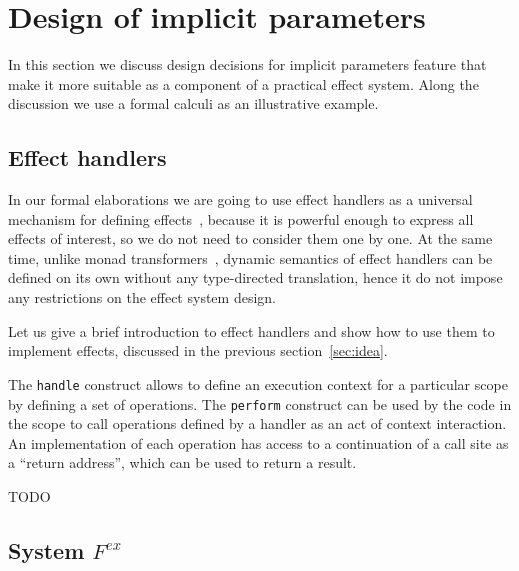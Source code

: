 \documentclass[acmsmall]{acmart}
\begin{document}
\section{Design of implicit parameters} \label{sec:implicits}

In this section we discuss design decisions for implicit parameters feature that make it more suitable as a component of a practical effect system.
Along the discussion we use a formal calculi as an illustrative example.

\subsection{Effect handlers} \label{subsec:handlers}

In our formal elaborations we are going to use effect handlers as a universal mechanism for defining effects~\cite{plotkin2003algebraic, plotkin2013handling}, because it is powerful enough to express all effects of interest, so we do not need to consider them one by one.
At the same time, unlike monad transformers~\cite{liang1995monad, schrijvers2019monad}, dynamic semantics of effect handlers can be defined on its own without any type-directed translation, hence it do not impose any restrictions on the effect system design.

Let us give a brief introduction to effect handlers and show how to use them to implement effects, discussed in the previous section~\ref{sec:idea}.

The \texttt{handle} construct allows to define an execution context for a particular scope by defining a set of operations.
The \texttt{perform} construct can be used by the code in the scope to call operations defined by a handler as an act of context interaction.
An implementation of each operation has access to a continuation of a call site as a ``return address'', which can be used to return a result. %





TODO %

\subsection{System $F^{ex}$} \label{subsec:core-lang}
\end{document}
